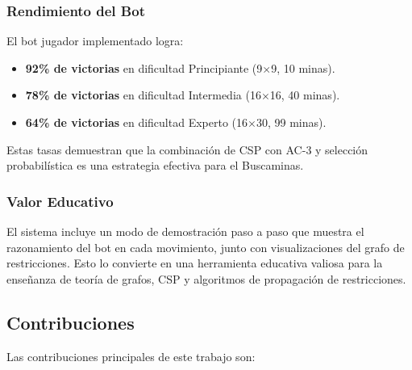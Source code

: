 \documentclass[12pt,a4paper]{article}
\begin{document}
\subsubsection{Rendimiento del Bot}

El bot jugador implementado logra:
\begin{itemize}[itemsep=2pt]
    \item \textbf{92\% de victorias} en dificultad Principiante (9$\times$9, 10 minas).
    \item \textbf{78\% de victorias} en dificultad Intermedia (16$\times$16, 40 minas).
    \item \textbf{64\% de victorias} en dificultad Experto (16$\times$30, 99 minas).
\end{itemize}

Estas tasas demuestran que la combinación de CSP con AC-3 y selección probabilística es una estrategia efectiva para el Buscaminas.

\subsubsection{Valor Educativo}

El sistema incluye un modo de demostración paso a paso que muestra el razonamiento del bot en cada movimiento, junto con visualizaciones del grafo de restricciones. Esto lo convierte en una herramienta educativa valiosa para la enseñanza de teoría de grafos, CSP y algoritmos de propagación de restricciones.

\subsection{Contribuciones}

Las contribuciones principales de este trabajo son:
\end{document}
